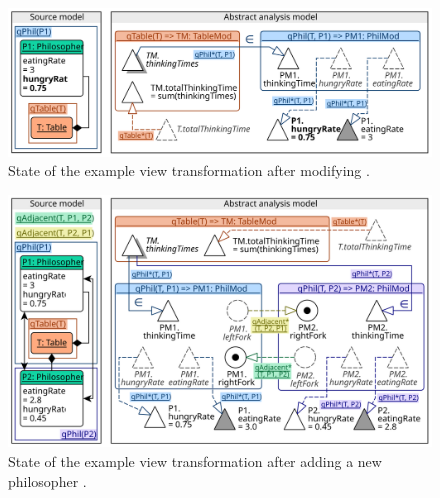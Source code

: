 \begin{figure}
  \centering
  \includegraphics[scale=0.9]{figures/view_transformation_example_2}
  \caption{State of the example view transformation after modifying .}
  \label{fig:transform:view-2}
\end{figure}

\begin{figure}
  \centering
  \includegraphics[scale=0.9]{figures/view_transformation_example}
  \caption{State of the example view transformation after adding a new philosopher .}
  \label{fig:transform:view-3}
\end{figure}


